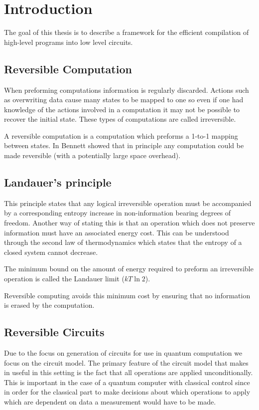 \chapter{Introduction}

The goal of this thesis is to describe a framework for the efficient compilation
of high-level programs into low level circuits.

\section{Reversible Computation}

When preforming computations information is regularly discarded. Actions such as
overwriting data cause many states to be mapped to one so even if one had
knowledge of the actions involved in a computation it may not be possible to
recover the initial state. These types of computations are called irreversible.

A reversible computation is a computation which preforms a 1-to-1 mapping
between states. In \cite{Bennett:73} Bennett showed that in principle any
computation could be made reversible (with a potentially large space overhead).

\section{Landauer's principle}

This principle states that any logical irreversible operation must be
accompanied by a corresponding entropy increase in non-information bearing
degrees of freedom\cite{bennett03}. Another way of stating this is that
an operation which does not preserve information must have an associated energy
cost. This can be understood through the second law of thermodynamics which
states that the entropy of a closed system cannot decrease.

The minimum bound on the amount of energy required to preform an irreversible
operation is called the Landauer limit ($kT\ln 2$).

Reversible computing avoids this minimum cost by ensuring that no information is
erased by the computation.

\section{Reversible Circuits}

Due to the focus on generation of circuits for use in quantum computation we
focus on the circuit model. The primary feature of the circuit model that makes
in useful in this setting is the fact that all operations are applied
unconditionally. This is important in the case of a quantum computer with
classical control since in order for  the classical part to make decisions about
which operations to apply which are dependent on data a measurement would have
to be made.

